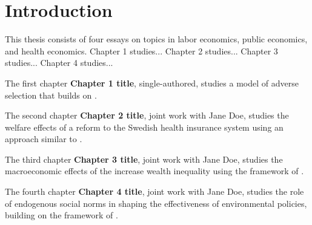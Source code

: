 \chapter*{Introduction}

This thesis consists of four essays on topics in labor economics, public economics, and health economics. Chapter 1 studies... Chapter 2 studies... Chapter 3 studies... Chapter 4 studies...

The first chapter \textbf{Chapter 1 title}, single-authored, studies a model of adverse selection that builds on \citet{akerlof1970market}. \lipsum[1-4]

The second chapter \textbf{Chapter 2 title}, joint work with Jane Doe, studies the welfare effects of a reform to the Swedish health insurance system using an approach similar to \citet{einav2010estimating}. \lipsum[1-4]

The third chapter \textbf{Chapter 3 title}, joint work with Jane Doe, studies the macroeconomic effects of the increase wealth inequality using the framework of \citet{krusell1998income}. \lipsum[1-4]

The fourth chapter \textbf{Chapter 4 title}, joint work with Jane Doe, studies the role of endogenous social norms in shaping the effectiveness of environmental policies, building on the framework of \citet{besley2023political}. \lipsum[1-4]

\newpage{}
\printbibliography[heading=subbibliography]
